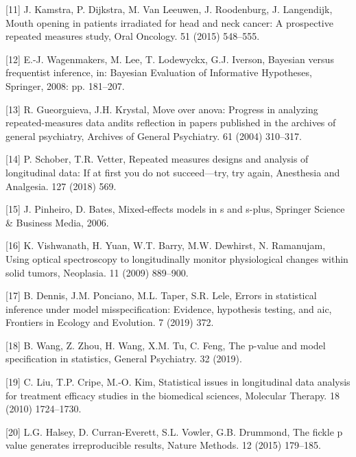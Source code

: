 \documentclass[
]{article}
\begin{document}
\leavevmode\hypertarget{ref-kamstra2015}{}%
{[}11{]} J. Kamstra, P. Dijkstra, M. Van Leeuwen, J. Roodenburg, J. Langendijk, Mouth opening in patients irradiated for head and neck cancer: A prospective repeated measures study, Oral Oncology. 51 (2015) 548--555.

\leavevmode\hypertarget{ref-wagenmakers2008}{}%
{[}12{]} E.-J. Wagenmakers, M. Lee, T. Lodewyckx, G.J. Iverson, Bayesian versus frequentist inference, in: Bayesian Evaluation of Informative Hypotheses, Springer, 2008: pp. 181--207.

\leavevmode\hypertarget{ref-gueorguieva2004}{}%
{[}13{]} R. Gueorguieva, J.H. Krystal, Move over anova: Progress in analyzing repeated-measures data andits reflection in papers published in the archives of general psychiatry, Archives of General Psychiatry. 61 (2004) 310--317.

\leavevmode\hypertarget{ref-schober2018}{}%
{[}14{]} P. Schober, T.R. Vetter, Repeated measures designs and analysis of longitudinal data: If at first you do not succeed---try, try again, Anesthesia and Analgesia. 127 (2018) 569.

\leavevmode\hypertarget{ref-pinheiro2006}{}%
{[}15{]} J. Pinheiro, D. Bates, Mixed-effects models in s and s-plus, Springer Science \& Business Media, 2006.

\leavevmode\hypertarget{ref-vishwanath2009}{}%
{[}16{]} K. Vishwanath, H. Yuan, W.T. Barry, M.W. Dewhirst, N. Ramanujam, Using optical spectroscopy to longitudinally monitor physiological changes within solid tumors, Neoplasia. 11 (2009) 889--900.

\leavevmode\hypertarget{ref-dennis2019}{}%
{[}17{]} B. Dennis, J.M. Ponciano, M.L. Taper, S.R. Lele, Errors in statistical inference under model misspecification: Evidence, hypothesis testing, and aic, Frontiers in Ecology and Evolution. 7 (2019) 372.

\leavevmode\hypertarget{ref-wang2019}{}%
{[}18{]} B. Wang, Z. Zhou, H. Wang, X.M. Tu, C. Feng, The p-value and model specification in statistics, General Psychiatry. 32 (2019).

\leavevmode\hypertarget{ref-liu2010}{}%
{[}19{]} C. Liu, T.P. Cripe, M.-O. Kim, Statistical issues in longitudinal data analysis for treatment efficacy studies in the biomedical sciences, Molecular Therapy. 18 (2010) 1724--1730.

\leavevmode\hypertarget{ref-halsey2015}{}%
{[}20{]} L.G. Halsey, D. Curran-Everett, S.L. Vowler, G.B. Drummond, The fickle p value generates irreproducible results, Nature Methods. 12 (2015) 179--185.
\end{document}
